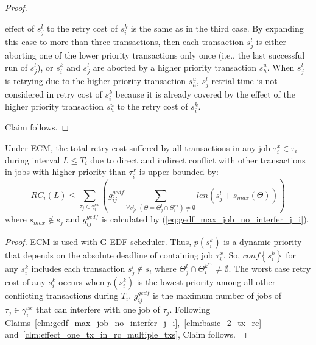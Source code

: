 \begin{proof}
\begin{enumerate}
effect of $s_{j}^{l}$ to the retry cost of $s_{i}^{k}$ is the same
as in the third case. By expanding this case to more than three transactions,
then each transaction $s_{j}^{l}$ is either aborting one of the lower
priority transactions only once (i.e., the last successful run of $s_j^l$), or $s_{i}^{k}$ and
$s_{j}^{l}$ are aborted by a higher priority transaction $s_{h}^{u}$. When $s_j^l$ is retrying due to the higher priority transaction $s_h^u$, $s_j^l$ retrial time is not considered in retry cost of $s_i^k$ because it is already covered by the effect of the higher priority transaction $s_h^u$ to the retry cost of $s_i^k$.
\end{enumerate}
Claim follows.
\end{proof}
%
\begin{clm}\label{gedf-edf}
Under ECM, the total retry cost suffered by all transactions in any job $\tau_i^x \in \tau_i$ during interval $L \le T_i$ due to direct and indirect conflict with other transactions in jobs with higher priority than $\tau_i^x$ is upper bounded by:
%
\begin{equation}
RC_i\left(L\right) \le \sum_{\tau_{j}\in\gamma_i^{ex}}\left(g_{ij}^{gedf} \sum_{\forall s_j^l,\,\left(\Theta=\Theta_j^l \cap \Theta_i^{ex}\right) \neq \emptyset} len\left(s_{j}^{l} + s_{max}(\Theta)\right)\right)\label{eq3}\end{equation}
%
where $s_{max} \not\in s_j$ and $g_{ij}^{gedf}$ is calculated by (\ref{eq:gedf_max_job_no_interfer_j_i}).
\end{clm}
\begin{proof}\normalfont
%
ECM is used with G-EDF scheduler. Thus, $p(s_i^k)$ is a dynamic priority that depends on the absolute deadline of containing job $\tau_i^x$. So, $conf\left\{ s_i^k \right\}$ for any $s_i^k$ includes each transaction $s_j^l \not\in s_i$ where $\Theta_j^l \cap \Theta_i^{k^{ex}} \neq \emptyset$. The worst case retry cost of any $s_i^k$ occurs when $p(s_i^k)$ is the lowest priority among all other conflicting transactions during $T_i$. $g_{ij}^{gedf}$ is the maximum number of jobs of $\tau_j \in \gamma_i^{ex}$ that can interfere with one job of $\tau_j$. Following Claims~\ref{clm:gedf_max_job_no_interfer_j_i},~\ref{clm:basic_2_tx_rc} and~\ref{clm:effect_one_tx_in_rc_multiple_txs}, Claim follows.
\end{proof}
%
